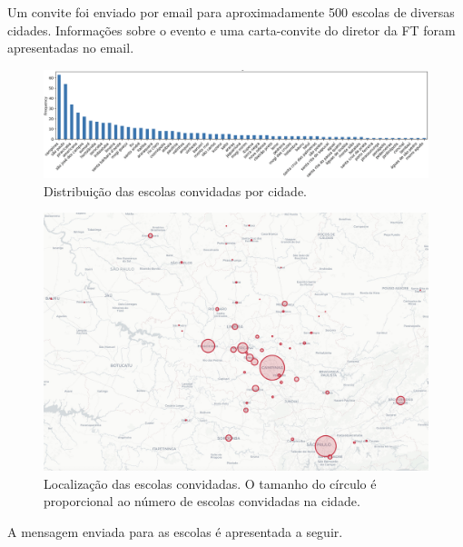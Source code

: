 \documentclass[
  letterpaper,
  DIV=11,
  numbers=noendperiod]{scrreprt}
\begin{document}
Um convite foi enviado por email para aproximadamente 500 escolas de
diversas cidades. Informações sobre o evento e uma carta-convite do
diretor da FT foram apresentadas no email.

\begin{figure}[H]

{\centering \includegraphics[width=1\linewidth,height=\textheight,keepaspectratio]{planejamento/escolas-convite-500.png}

}

\caption{Distribuição das escolas convidadas por cidade.}

\end{figure}%

\begin{figure}[H]

{\centering \includegraphics[width=1\linewidth,height=\textheight,keepaspectratio]{planejamento/mapa-escolas.jpg}

}

\caption{Localização das escolas convidadas. O tamanho do círculo é
proporcional ao número de escolas convidadas na cidade.}

\end{figure}%

A mensagem enviada para as escolas é apresentada a seguir.
\end{document}

